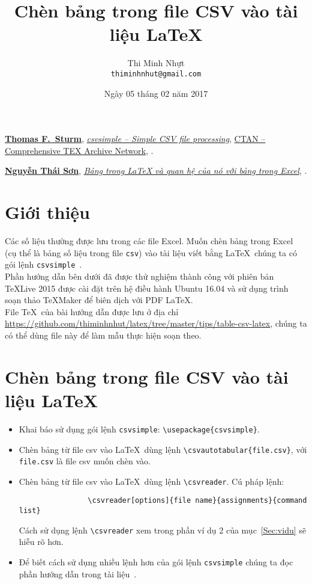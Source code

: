 \documentclass[12pt,a4paper]{article}
\title{\bfseries \huge Chèn bảng trong file CSV vào tài liệu \LaTeX}
\author{\Large Thi Minh Nhựt \bigskip \\ \Large \texttt{thiminhnhut@gmail.com}}
\date{\Large Ngày 05 tháng 02 năm 2017}
\begin{document}
\maketitle
\tableofcontents

\begin{thebibliography}{99}
	 \href{https://www.ctan.org/author/sturm}{\textbf{Thomas F.~Sturm}}, \href{https://www.ctan.org/pkg/csvsimple}{\emph{csvsimple – Simple CSV file processing}}, \href{https://www.ctan.org/}{CTAN -- Comprehensive TEX Archive Network}, .
	
	 \href{https://osshcmup.wordpress.com/}{\textbf{Nguyễn Thái Sơn}}, \href{https://goo.gl/F3o77y}{\emph{Bảng trong LaTeX và quan hệ của nó với bảng trong Excel}}, .		
\end{thebibliography}

\section{Giới thiệu}
	Các số liệu thường được lưu trong các file Excel. Muốn chèn bảng trong Excel (cụ thể là bảng số liệu trong file \verb|csv|) vào tài liệu viết bằng \LaTeX\, chúng ta có gói lệnh \verb|csvsimple|~\cite{csvsimple-ctan}.\\

	Phần hướng dẫn bên dưới đã được thử nghiệm thành công với phiên bản \TeX Live 2015 được cài đặt trên hệ điều hành Ubuntu 16.04 và sử dụng trình soạn thảo \TeX Maker để biên dịch với PDF \LaTeX. \\
	
	File \TeX\ của bài hướng dẫn được lưu ở địa chỉ \url{https://github.com/thiminhnhut/latex/tree/master/tips/table-csv-latex}, chúng ta có thể dùng file này để làm mẫu thực hiện soạn theo.

\section{Chèn bảng trong file CSV vào tài liệu \LaTeX}
	\begin{itemize}
		\item Khai báo sử dụng gói lệnh \verb|csvsimple|: \verb|\usepackage{csvsimple}|.

		\item Chèn bảng từ file csv vào \LaTeX\ dùng lệnh \verb|\csvautotabular{file.csv}|, với \verb|file.csv| là file csv muốn chèn vào.
		
		\item Chèn bảng từ file csv vào \LaTeX\ dùng lệnh \verb|\csvreader|. Cú pháp lệnh:
			\begin{verbatim}
				\csvreader[options]{file name}{assignments}{command list}
			\end{verbatim}
			
		Cách sử dụng lệnh \verb|\csvreader| xem trong phần ví dụ 2 của mục~\ref{Sec:vidu} sẽ hiễu rõ hơn.
		
		\item Để biết cách sử dụng nhiều lệnh hơn của gói lệnh \verb|csvsimple| chúng ta đọc phần hướng dẫn trong tài liệu~\cite{csvsimple-ctan}.
	\end{itemize}
\end{document}
